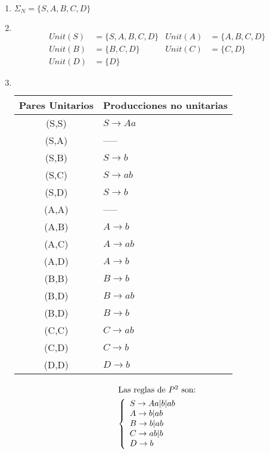 \begin{enumerate}
\item $\Sigma_N =\{ S,A,B,C,D\}$
\item $\,$\\
\begin{align*}
Unit(S)	&=\{S,A,B,C,D\}	&Unit(A)	&=\{ A,B,C,D\}	\\
Unit(B)	&=\{B,C,D\}		&Unit(C)	&=\{C,D\}	\\
Unit(D)	&=\{D\}			&
\end{align*}
\item $\,$\\
\begin{tabular}{|c|l|}\hline
Pares Unitarios	&	Producciones no unitarias	\\ \hline
(S,S)			&	$S\rightarrow Aa$	\\
(S,A)			&	-----	\\
(S,B)			&	$S\rightarrow b$	\\
(S,C)			&	$S\rightarrow ab$	\\
(S,D)			&	$S\rightarrow b$	\\
(A,A)			&	-----	\\
(A,B)			&	$A\rightarrow b$	\\
(A,C)			&	$A\rightarrow ab$	\\
(A,D)			&	$A\rightarrow b$	\\
(B,B)			&	$B\rightarrow b$	\\
(B,D)			&	$B\rightarrow ab$	\\
(B,D)			&	$B\rightarrow b$	\\
(C,C)			&	$C\rightarrow ab$	\\
(C,D)			&	$C\rightarrow b$	\\
(D,D)			&	$D\rightarrow b$	\\ \hline
\end{tabular}
\begin{align*}
\intertext{Las reglas de $P^2$ son:}
\left \{ \begin{array}{l}
S\rightarrow Aa|b|ab	\\
A\rightarrow b|ab	\\
B\rightarrow b|ab	\\
C\rightarrow ab|b	\\
D\rightarrow b
\end{array}\right.
\end{align*}
\end{enumerate}